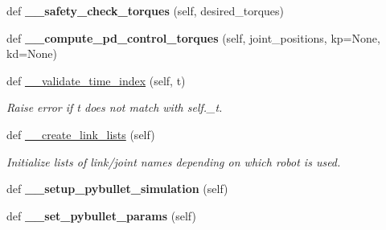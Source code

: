 \begin{DoxyCompactItemize}
def {\bfseries \+\_\+\+\_\+safety\+\_\+check\+\_\+torques} (self, desired\+\_\+torques)
\item 
\mbox{\label{classtrifinger__simulation_1_1sim__finger_1_1SimFinger_a089d0071570e20fec80293c13b3cc47d}} 
def {\bfseries \+\_\+\+\_\+compute\+\_\+pd\+\_\+control\+\_\+torques} (self, joint\+\_\+positions, kp=None, kd=None)
\item 
\mbox{\label{classtrifinger__simulation_1_1sim__finger_1_1SimFinger_a31c82455c5345ff47a0e7ce1bc22df13}} 
def \hyperlink{classtrifinger__simulation_1_1sim__finger_1_1SimFinger_a31c82455c5345ff47a0e7ce1bc22df13}{\+\_\+\+\_\+validate\+\_\+time\+\_\+index} (self, t)
\begin{DoxyCompactList}\small\item\em Raise error if t does not match with self.\+\_\+t. \end{DoxyCompactList}\item 
\mbox{\label{classtrifinger__simulation_1_1sim__finger_1_1SimFinger_a3ce491d53c13c11b3db5c8b5846570b2}} 
def \hyperlink{classtrifinger__simulation_1_1sim__finger_1_1SimFinger_a3ce491d53c13c11b3db5c8b5846570b2}{\+\_\+\+\_\+create\+\_\+link\+\_\+lists} (self)
\begin{DoxyCompactList}\small\item\em Initialize lists of link/joint names depending on which robot is used. \end{DoxyCompactList}\item 
\mbox{\label{classtrifinger__simulation_1_1sim__finger_1_1SimFinger_a4c3d2e479821ee10759db74151308932}} 
def {\bfseries \+\_\+\+\_\+setup\+\_\+pybullet\+\_\+simulation} (self)
\item 
\mbox{\label{classtrifinger__simulation_1_1sim__finger_1_1SimFinger_a8942bdfacf8a1c9750422f95cc955bf7}} 
def {\bfseries \+\_\+\+\_\+set\+\_\+pybullet\+\_\+params} (self)
\item 
\mbox{\label{classtrifinger__simulation_1_1sim__finger_1_1SimFinger_a0a10efd7b04307ad71fbaf45ec94a6fe}} 

\end{DoxyCompactItemize}
